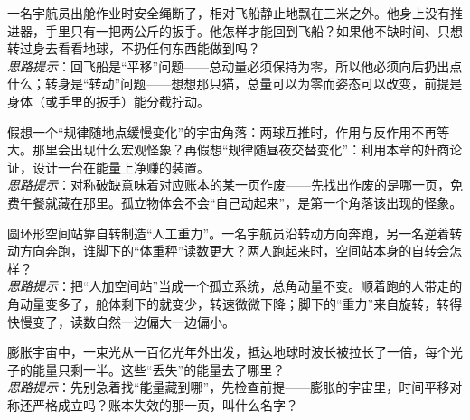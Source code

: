 \begin{puzzles}
\item 一名宇航员出舱作业时安全绳断了，相对飞船静止地飘在三米之外。他身上没有推进器，手里只有一把两公斤的扳手。他怎样才能回到飞船？如果他不缺时间、只想转过身去看看地球，不扔任何东西能做到吗？\\
\emph{思路提示}：回飞船是“平移”问题——总动量必须保持为零，所以他必须向后扔出点什么；转身是“转动”问题——想想那只猫，总量可以为零而姿态可以改变，前提是身体（或手里的扳手）能分截拧动。

\item 假想一个“规律随地点缓慢变化”的宇宙角落：两球互推时，作用与反作用不再等大。那里会出现什么宏观怪象？再假想“规律随昼夜交替变化”：利用本章的奸商论证，设计一台在能量上净赚的装置。\\
\emph{思路提示}：对称破缺意味着对应账本的某一页作废——先找出作废的是哪一页，免费午餐就藏在那里。孤立物体会不会“自己动起来”，是第一个角落该出现的怪象。

\item 圆环形空间站靠自转制造“人工重力”。一名宇航员沿转动方向奔跑，另一名逆着转动方向奔跑，谁脚下的“体重秤”读数更大？两人跑起来时，空间站本身的自转会怎样？\\
\emph{思路提示}：把“人加空间站”当成一个孤立系统，总角动量不变。顺着跑的人带走的角动量变多了，舱体剩下的就变少，转速微微下降；脚下的“重力”来自旋转，转得快慢变了，读数自然一边偏大一边偏小。

\item 膨胀宇宙中，一束光从一百亿光年外出发，抵达地球时波长被拉长了一倍，每个光子的能量只剩一半。这些“丢失”的能量去了哪里？\\
\emph{思路提示}：先别急着找“能量藏到哪”，先检查前提——膨胀的宇宙里，时间平移对称还严格成立吗？账本失效的那一页，叫什么名字？
\end{puzzles}
